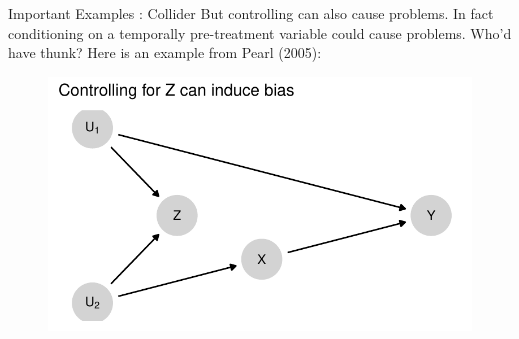 \documentclass[
  11pt,
  ignorenonframetext,
]{beamer}
\begin{document}
\begin{frame}{Important Examples : Collider}
\protect\hypertarget{important-examples-collider}{}
But controlling can also cause problems. In fact conditioning on a
temporally pre-treatment variable could cause problems. Who'd have
thunk? Here is an example from Pearl (2005):

\begin{figure}

{\centering \includegraphics{0_lectures_files/figure-beamer/unnamed-chunk-247-1.pdf}

}

\end{figure}
\end{frame}
\end{document}
